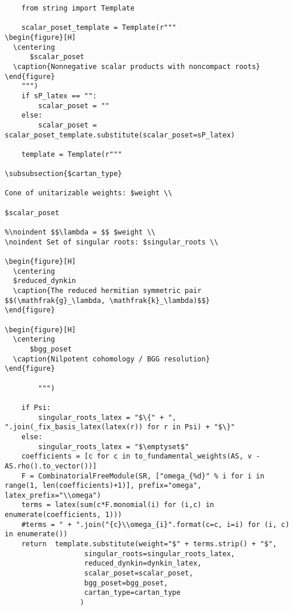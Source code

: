 \begin{verbatim}
    from string import Template

    scalar_poset_template = Template(r"""
\begin{figure}[H]
  \centering
      $scalar_poset
  \caption{Nonnegative scalar products with noncompact roots}
\end{figure}
    """)
    if sP_latex == "":
        scalar_poset = ""
    else:
        scalar_poset = scalar_poset_template.substitute(scalar_poset=sP_latex)

    template = Template(r"""

\subsubsection{$cartan_type}

Cone of unitarizable weights: $weight \\

$scalar_poset

%\noindent $$\lambda = $$ $weight \\
\noindent Set of singular roots: $singular_roots \\

\begin{figure}[H]
  \centering
  $reduced_dynkin
  \caption{The reduced hermitian symmetric pair $$(\mathfrak{g}_\lambda, \mathfrak{k}_\lambda)$$}
\end{figure}

\begin{figure}[H]
  \centering
      $bgg_poset
  \caption{Nilpotent cohomology / BGG resolution}
\end{figure}

        """)

    if Psi:
        singular_roots_latex = "$\{" + ", ".join(_fix_basis_latex(latex(r)) for r in Psi) + "$\}"
    else:
        singular_roots_latex = "$\emptyset$"
    coefficients = [c for c in to_fundamental_weights(AS, v - AS.rho().to_vector())]
    F = CombinatorialFreeModule(SR, ["omega_{%d}" % i for i in range(1, len(coefficients)+1)], prefix="omega", latex_prefix="\\omega")
    terms = latex(sum(c*F.monomial(i) for (i,c) in enumerate(coefficients, 1)))
    #terms = " + ".join("{c}\\omega_{i}".format(c=c, i=i) for (i, c) in enumerate())
    return  template.substitute(weight="$" + terms.strip() + "$",
                   singular_roots=singular_roots_latex,
                   reduced_dynkin=dynkin_latex,
                   scalar_poset=scalar_poset,
                   bgg_poset=bgg_poset,
                   cartan_type=cartan_type
                  )

\end{verbatim}